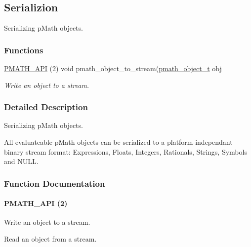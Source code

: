 \hypertarget{group__serialization}{
\subsection{Serializion}
\label{group__serialization}
}
Serializing pMath objects.  
\subsubsection*{Functions}
\begin{CompactItemize}
\item 
\hyperlink{group__serialization_g8b9e7328aea3833ee8bfea645ae4ca99}{PMATH\_\-API} (2) void pmath\_\-object\_\-to\_\-stream(\hyperlink{classpmath__object__t}{pmath\_\-object\_\-t} obj
\begin{CompactList}\small\item\em Write an object to a stream. \item\end{CompactList}\end{CompactItemize}


\subsubsection{Detailed Description}
Serializing pMath objects. 

All evaluateable pMath objects can be serialized to a platform-independant binary stream format: Expressions, Floats, Integers, Rationals, Strings, Symbols and NULL. 

\subsubsection{Function Documentation}
\hypertarget{group__serialization_g8b9e7328aea3833ee8bfea645ae4ca99}{
\paragraph[PMATH\_\-API]{\setlength{\rightskip}{0pt plus 5cm}PMATH\_\-API (2)}\hfill}
\label{group__serialization_g8b9e7328aea3833ee8bfea645ae4ca99}


Write an object to a stream. 

Read an object from a stream.

